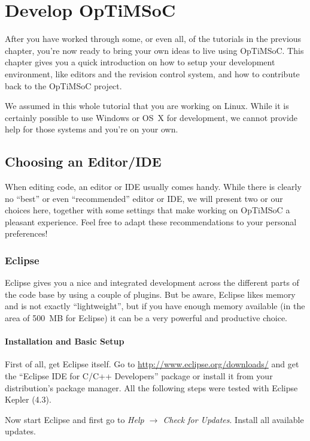 \chapter{Develop OpTiMSoC}

After you have worked through some, or even all, of the tutorials in the
previous chapter, you're now ready to bring your own ideas to live using
OpTiMSoC. This chapter gives you a quick introduction on how to setup your
development environment, like editors and the revision control system, and how
to contribute back to the OpTiMSoC project.

We assumed in this whole tutorial that you are working on Linux. While it is
certainly possible to use Windows or OS~X for development, we cannot provide
help for those systems and you're on your own.

\section{Choosing an Editor/IDE}

When editing code, an editor or IDE usually comes handy. While there is clearly
no ``best'' or even ``recommended'' editor or IDE, we will present two or our
choices here, together with some settings that make working on OpTiMSoC a
pleasant experience. Feel free to adapt these recommendations to your personal
preferences!

\subsection{Eclipse}

Eclipse gives you a nice and integrated development across the different parts
of the code base by using a couple of plugins. But be aware, Eclipse likes
memory and is not exactly ``lightweight'', but if you have enough memory
available (in the area of 500~MB for Eclipse) it can be a very powerful and
productive choice.

\subsubsection{Installation and Basic Setup}

First of all, get Eclipse itself. Go to \url{http://www.eclipse.org/downloads/}
and get the ``Eclipse IDE for C/C++ Developers'' package or install it from
your distribution's package manager. All the following steps were tested with
Eclipse Kepler (4.3).

Now start Eclipse and first go to \emph{Help $\rightarrow$ Check for Updates}.
Install all available updates.

